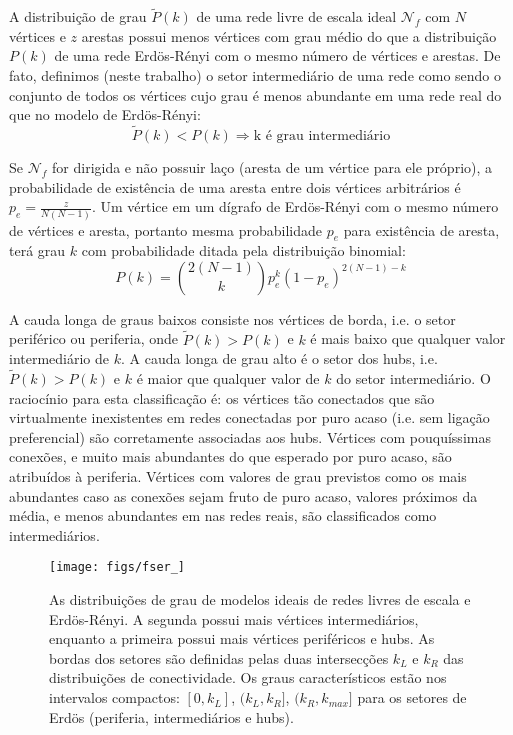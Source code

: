 \documentclass[a4paper,openright,12pt]{report} %
\begin{document}
A distribuição de grau
$\widetilde{P}(k)$
de uma rede livre de escala ideal
$\mathcal{N}_f$ com $N$ 
vértices e $z$ arestas possui menos
vértices com grau médio do que a distribuição $P(k)$
de uma rede Erdös-Rényi com o mesmo número de vértices e arestas.
De fato, definimos (neste trabalho) o setor intermediário de uma
rede como sendo o conjunto de todos os vértices cujo grau é
menos abundante em uma rede real do que no modelo de Erdös-Rényi:
\begin{equation}\label{criterio}
    \widetilde{P}(k)<P(k) \Rightarrow \text{k é grau intermediário}
\end{equation}

Se $\mathcal{N}_f$ for dirigida e não possuir laço (aresta de um vértice para ele próprio),
a probabilidade
de existência de uma aresta entre dois vértices arbitrários é
$p_e=\frac{z}{N(N-1)}$.
Um vértice em um dígrafo de Erdös-Rényi com o mesmo número de vértices e aresta,
portanto mesma probabilidade
$p_e$
para existência de aresta, terá grau $k$ com probabilidade ditada pela distribuição binomial:
\begin{equation}
    P(k)=\binom{2(N-1)}{k}p_e^k(1-p_e)^{2(N-1)-k}
\end{equation}

A cauda longa de graus baixos consiste nos vértices de borda,
i.e. o setor periférico ou periferia, onde
$\widetilde{P}(k)>P(k)$ e $k$ é mais baixo
que qualquer valor intermediário de $k$.
A cauda longa de grau alto é o setor dos hubs,
i.e.
$\widetilde{P}(k)>P(k)$ e $k$ é maior que qualquer valor de $k$ do setor
intermediário.
O raciocínio para esta classificação é: os vértices tão conectados
que são virtualmente inexistentes em redes conectadas por puro acaso
(i.e. sem ligação preferencial) são corretamente associadas
aos hubs.
Vértices com pouquíssimas conexões, e muito mais abundantes do que esperado
por puro acaso, são atribuídos à periferia.
Vértices com valores de grau previstos como os mais abundantes caso
as conexões sejam fruto de puro acaso, valores próximos da média,
e menos abundantes em nas redes reais, são classificados como intermediários.

\begin{figure}[!h]
    \centering
    \texttt{[image: figs/fser\_]}
    \caption{As distribuições de grau de modelos ideais de redes livres de escala e Erdös-Rényi.
        A segunda possui mais vértices intermediários, enquanto a primeira possui mais vértices
        periféricos e hubs. As bordas dos setores são definidas pelas duas intersecções $k_L$
        e $k_R$ das distribuições de conectividade.
        Os graus característicos estão nos intervalos compactos:
                $[0,k_L]$, $(k_L,k_R]$, $(k_R,k_{max}]$
    para os setores de Erdös (periferia, intermediários e hubs).}   
        \label{fig:setores}
\end{figure}
\end{document}
